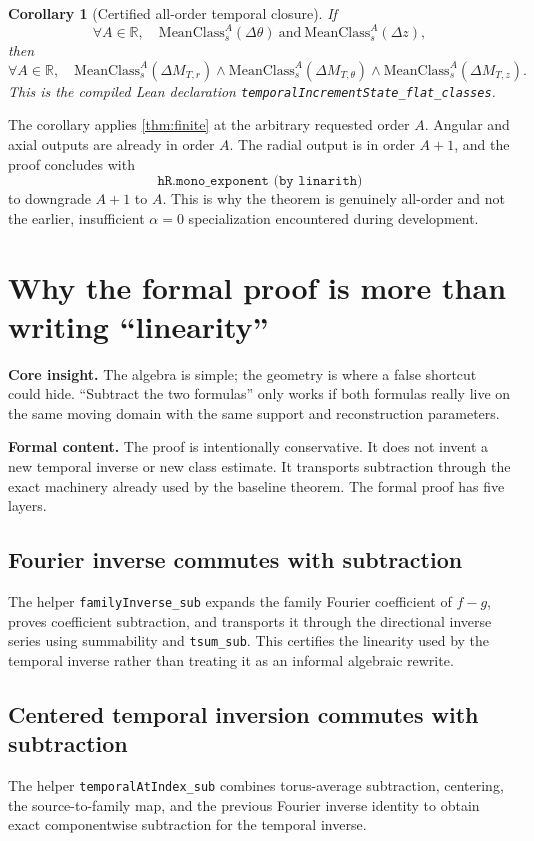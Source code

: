 \documentclass[11pt]{article}
\theoremstyle{highend}
\newtheorem{corollary}[theorem]{Corollary}
\theoremstyle{definition}
\newcommand{\MeanClass}{\mathrm{MeanClass}}
\begin{document}
\begin{corollary}[Certified all-order temporal closure]\label{cor:flat}
If
\[
\forall A\in\mathbb R,\quad
\MeanClass_s^A(\Delta\theta)\ \text{and}\ \MeanClass_s^A(\Delta z),
\]
then
\[
\forall A\in\mathbb R,\quad
\MeanClass_s^A(\Delta M_{T,r})\wedge
\MeanClass_s^A(\Delta M_{T,\theta})\wedge
\MeanClass_s^A(\Delta M_{T,z}).
\]
This is the compiled Lean declaration
\texttt{temporalIncrementState\_flat\_classes}.
\end{corollary}

\noindent The corollary applies \cref{thm:finite} at the arbitrary requested order \(A\). Angular and axial outputs are already in order \(A\). The radial output is in order \(A+1\), and the proof concludes with
\[
\texttt{hR.mono\_exponent (by linarith)}
\]
to downgrade \(A+1\) to \(A\). This is why the theorem is genuinely all-order and not the earlier, insufficient \(\alpha=0\) specialization encountered during development.

\section{Why the formal proof is more than writing ``linearity''}
\begin{eurekabox}
\textbf{Core insight.} The algebra is simple; the geometry is where a false shortcut could hide. ``Subtract the two formulas'' only works if both formulas really live on the same moving domain with the same support and reconstruction parameters.
\end{eurekabox}
\noindent\textbf{Formal content.}
The proof is intentionally conservative. It does not invent a new temporal inverse or new class estimate. It transports subtraction through the exact machinery already used by the baseline theorem. The formal proof has five layers.

\subsection{Fourier inverse commutes with subtraction}
The helper \texttt{familyInverse\_sub} expands the family Fourier coefficient of \(f-g\), proves coefficient subtraction, and transports it through the directional inverse series using summability and \texttt{tsum\_sub}. This certifies the linearity used by the temporal inverse rather than treating it as an informal algebraic rewrite.

\subsection{Centered temporal inversion commutes with subtraction}
The helper \texttt{temporalAtIndex\_sub} combines torus-average subtraction, centering, the source-to-family map, and the previous Fourier inverse identity to obtain exact componentwise subtraction for the temporal inverse.
\end{document}
